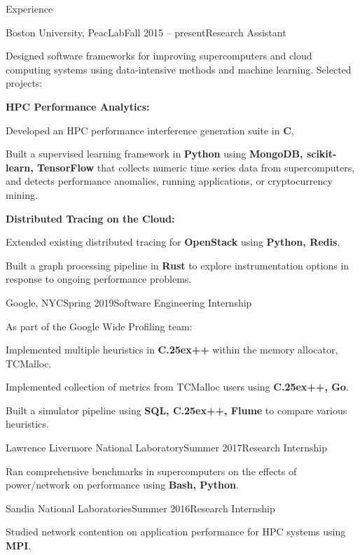 \documentclass{resume}
\def\bfCplusplus{{\rm{\bf C\raise.25ex\hbox{\small ++}}}}
\begin{document}
\begin{rSection}{Experience}

\begin{rWorksection}{Boston University, PeacLab}{Fall 2015 -- present}{Research Assistant}
\item Designed software frameworks for improving supercomputers and cloud
  computing systems using data-intensive methods and machine learning. Selected
  projects:
\item {\bf HPC Performance Analytics:}
  \begin{rList}
  \item Developed an HPC performance interference generation suite in {\bf C},
  \item Built a supervised learning framework in {\bf Python} using {\bf
      MongoDB, scikit-learn, TensorFlow} that collects numeric time series data
    from supercomputers, and detects performance anomalies, running
    applications, or cryptocurrency mining.
  \end{rList}
\item {\bf Distributed Tracing on the Cloud:}
  \begin{rList}
  \item Extended existing distributed tracing for {\bf OpenStack} using {\bf
      Python, Redis},
  \item Built a graph processing pipeline in {\bf Rust} to explore
    instrumentation options in response to ongoing performance problems.
  \end{rList}
\end{rWorksection}

\begin{rWorksection}{Google, NYC}{Spring 2019}{Software Engineering
    Internship}
\item As part of the Google Wide Profiling team:
  \begin{rList}
  \item Implemented multiple heuristics in {\bf \bfCplusplus{}} within the memory
    allocator, TCMalloc.
  \item Implemented collection of metrics from TCMalloc users using {\bf
      \bfCplusplus{}, Go}.
  \item Built a simulator pipeline using {\bf SQL, \bfCplusplus{}, Flume} to
    compare various heuristics.
  \end{rList}
\end{rWorksection}

\begin{rWorksection}{Lawrence Livermore National Laboratory}{Summer
    2017}{Research Internship}
\item Ran comprehensive benchmarks in supercomputers on the effects of
  power/network on performance using {\bf Bash, Python}.
\end{rWorksection}

\begin{rWorksection}{Sandia National Laboratories}{Summer 2016}{Research
    Internship}
\item Studied network contention on application performance for HPC systems
  using {\bf MPI}.
\end{rWorksection}

\end{rSection}
\end{document}
